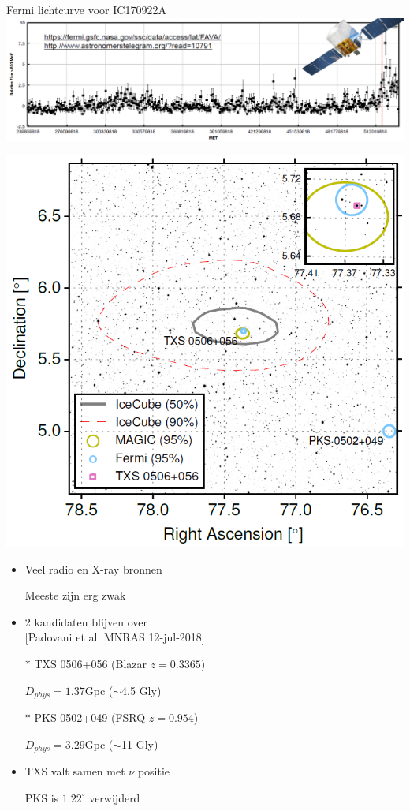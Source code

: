 \Tr
\onecolumn
\vspace*{2cm}
\begin{center}
{\blue Fermi lichtcurve voor IC170922A}\\[3mm]
\includegraphics[keepaspectratio,width=25cm]{IC170922A-Fermi}
\end{center}

\Tr
{}
\includegraphics[keepaspectratio,width=13.5cm]{IC170922A-area}

\newpage

\begin{itemize}
\item Veel radio en X-ray bronnen
\item[] Meeste zijn erg zwak
\item 2 kandidaten blijven over\\
      {\large [Padovani et al. MNRAS 12-jul-2018]}
\item[$\ast$] TXS 0506+056 (Blazar $z=0.3365$)
\item[] $D_{phys}=1.37$Gpc ($\sim$4.5 Gly)
\item[$\ast$] PKS 0502+049 (FSRQ $z=0.954$)
\item[] $D_{phys}=3.29$Gpc ($\sim$11 Gly)
\item TXS valt samen met $\nu$ positie
\item[] PKS is $1.22^{\circ}$ verwijderd
\end{itemize}

